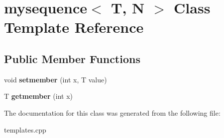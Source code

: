 \hypertarget{classmysequence}{\section{mysequence$<$ T, N $>$ Class Template Reference}
\label{classmysequence}
}
\subsection*{Public Member Functions}
\begin{DoxyCompactItemize}
\item 
\hypertarget{classmysequence_a424313e94366d76e54e3cee1baebd154}{void {\bfseries setmember} (int x, T value)}\label{classmysequence_a424313e94366d76e54e3cee1baebd154}

\item 
\hypertarget{classmysequence_adb9bfa60748ca425827b7a0145e4ac5c}{T {\bfseries getmember} (int x)}\label{classmysequence_adb9bfa60748ca425827b7a0145e4ac5c}

\end{DoxyCompactItemize}


The documentation for this class was generated from the following file\-:\begin{DoxyCompactItemize}
\item 
templates.\-cpp\end{DoxyCompactItemize}
